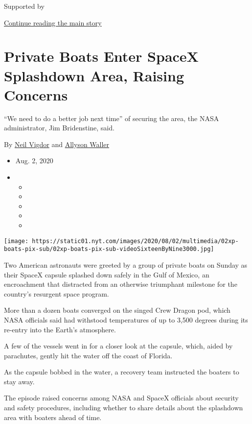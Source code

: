 Supported by

\protect\hyperlink{after-sponsor}{Continue reading the main story}

\hypertarget{private-boats-enter-spacex-splashdown-area-raising-concerns}{%
\section{Private Boats Enter SpaceX Splashdown Area, Raising
Concerns}\label{private-boats-enter-spacex-splashdown-area-raising-concerns}}

``We need to do a better job next time'' of securing the area, the NASA
administrator, Jim Bridenstine, said.

By \href{https://www.nytimes.com/by/neil-vigdor}{Neil Vigdor} and
\href{https://www.nytimes.com/by/allyson-waller}{Allyson Waller}

\begin{itemize}
\item
  Aug. 2, 2020
\item
  \begin{itemize}
  \item
  \item
  \item
  \item
  \item
  \end{itemize}
\end{itemize}

\texttt{[image: https://static01.nyt.com/images/2020/08/02/multimedia/02xp-boats-pix-sub/02xp-boats-pix-sub-videoSixteenByNine3000.jpg]}

Two American astronauts were greeted by a group of private boats on
Sunday as their SpaceX capsule splashed down safely in the Gulf of
Mexico, an encroachment that distracted from an otherwise triumphant
milestone for the country's resurgent space program.

More than a dozen boats converged on the singed Crew Dragon pod, which
NASA officials said had withstood temperatures of up to 3,500 degrees
during its re-entry into the Earth's atmosphere.

A few of the vessels went in for a closer look at the capsule, which,
aided by parachutes, gently hit the water off the coast of Florida.

As the capsule bobbed in the water, a recovery team instructed the
boaters to stay away.

The episode raised concerns among NASA and SpaceX officials about
security and safety procedures, including whether to share details about
the splashdown area with boaters ahead of time.

